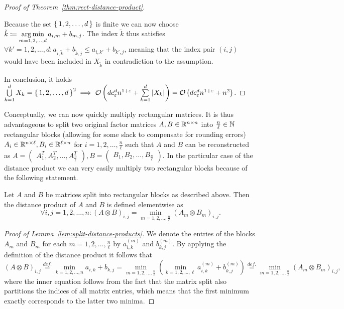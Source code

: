 \begin{proof}[Proof of Theorem~\ref{thm:rect-distance-product}]
\begin{enumerate}
            Because the set $\left\{\,1, 2, \dots, d\,\right\}$ is finite we can now choose $\tilde{k} \coloneqq \operatorname*{arg\,min}\limits_{m = 1, 2, \dots, d} a_{i, m} + b_{m, j}$.
            The index $\tilde{k}$ thus satisfies $\forall k' = 1, 2, \dots, d: a_{i, \tilde{k}} + b_{\tilde{k}, j} \leq a_{i, k'} + b_{k', j}$, meaning that the index pair $(i, j)$ would have been included in $X_{\tilde{k}}$ in contradiction to the assumption. \Lightning{}
    \end{enumerate}
    In conclusion, it holds $\bigcup\limits_{k = 1}^d X_k = \left\{\,1, 2, \dots, d\,\right\}^2 \implies \mathcal{O}\left( d c_\varepsilon^d n^{1 + \varepsilon} + \sum\limits_{k = 1}^d \left\lvert X_k\right\rvert_{} \right) = \mathcal{O}\left( d c_\varepsilon^d n^{1 + \varepsilon} + n^2 \right)$.
\end{proof}

Conceptually, we can now quickly multiply rectangular matrices.
It is thus advantageous to split two original factor matrices $A, B \in \mathbb{R}^{n \times n}$ into $\frac{n}{\ell} \in \mathbb{N}$ rectangular blocks (allowing for some slack to compensate for rounding errors) $A_i \in \mathbb{R}^{n \times \ell}, B_i \in \mathbb{R}^{\ell \times n}$ for $i = 1, 2, \dots, \frac{n}{\ell}$ such that $A$ and $B$ can be reconstructed as $A = \begin{pmatrix}
        A_1^T, A_2^T, \dots, A_{\frac{n}{\ell}}^T
    \end{pmatrix},
    B = \begin{pmatrix}
        B_1, B_2, \dots, B_{\frac{n}{\ell}}
    \end{pmatrix}$.
In the particular case of the distance product we can very easily multiply two rectangular blocks because of the following statement.

\begin{lemma}\label{lem:split-distance-products}
    Let $A$ and $B$ be matrices split into rectangular blocks as described above.
    Then the distance product of $A$ and $B$ is defined elementwise as
    \[
        \forall i, j = 1, 2, \dots, n: {(A \otimes B)}_{i, j} = \min\limits_{m = 1, 2, \dots, \frac{n}{\ell}} {(A_m \otimes B_m)}_{i, j}.
    \]
\end{lemma}

\begin{proof}[Proof of Lemma~\ref{lem:split-distance-products}]
    We denote the entries of the blocks $A_m$ and $B_m$ for each $m = 1, 2, \dots, \frac{n}{\ell}$ by $a_{i, k}^{(m)}$ and $b_{k, j}^{(m)}$.
    By applying the definition of the distance product it follows that
    \[
        {(A \otimes B)}_{i, j} \overset{def.}{=} \min\limits_{k = 1, 2, \dots, n} a_{i, k} + b_{k, j} = \min\limits_{m = 1, 2, \dots, \frac{n}{\ell}} \left( \min\limits_{k = 1, 2, \dots, \ell} a_{i, k}^{(m)} + b_{k, j}^{(m)} \right) \overset{def.}{=} \min\limits_{m = 1, 2, \dots, \frac{n}{\ell}} {(A_m \otimes B_m)}_{i, j},
    \]
    where the inner equation follows from the fact that the matrix split also partitions the indices of all matrix entries, which means that the first minimum exactly corresponds to the latter two minima.
\end{proof}

